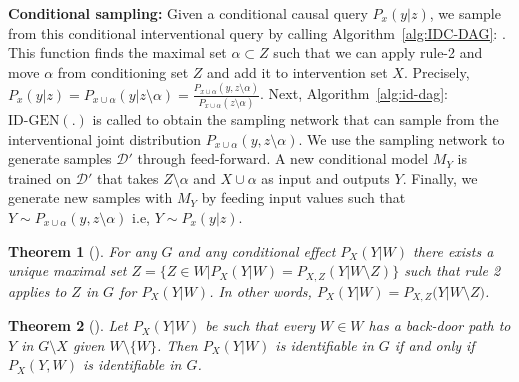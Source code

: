 \documentclass{article}
\newcommand{\data}{\mathcal{D}}
\newcommand{\idgen}{\text{ID-GEN}\xspace}
\newcommand{\idcdag}{\text{IDC-GEN}\xspace}
\theoremstyle{plain}
\newtheorem{theorem}{Theorem}[section]
\theoremstyle{definition}
\theoremstyle{remark}
\begin{document}
	\label{appex:cond-intv-samp}
	\textbf{Conditional sampling:}
	Given a conditional causal query $P_{x}({y}|{z})$,
	we sample from this conditional interventional query by calling Algorithm~\ref{alg:IDC-DAG}: \idcdag. 
	This function finds the maximal set ${\alpha }\subset {Z}$ such that we can apply rule-2 and move ${\alpha}$ from conditioning set ${Z}$ and add it to intervention set ${X}$. Precisely, $P_{{x}}({y}|{z})= P_{{x\cup \alpha}}({y}|{z\setminus \alpha}) =  \frac{P_{{x\cup \alpha}}({y},{z\setminus \alpha})}{P_{{x\cup \alpha}}({z\setminus \alpha})} $. 
	Next, Algorithm~\ref{alg:id-dag}: $\mathrm{\idgen(.)}$ is called to obtain the sampling network that can sample from the interventional joint distribution $P_{{x\cup \alpha}}({y},{z\setminus \alpha})$. 
	We use the sampling network to generate samples $\data'$ through feed-forward.
	A new conditional model $M_{{Y}}$ is trained on $\data'$ that takes ${Z\setminus \alpha}$ and $X\cup \alpha$ as input and outputs ${Y}$. Finally, we generate new samples with $M_{{Y}}$ by feeding input values such that $Y\sim P_{{x\cup \alpha}}({y},{z\setminus \alpha})$ i.e,  $Y\sim P_{x}(y|z)$.
	
	
	
	
	
	
	\begin{theorem}[\citet{shpitser2008complete}]
		\label{theorem20}
		For any $G$ and any conditional effect $P_{{X}}({Y}|{W})$ there exists a unique maximal set
		${Z}= \{Z \in {W}|P_{{X}}({Y}|{W}) = P_{{X,Z}}({Y|W} \setminus {Z})\}$ such that rule 2 applies to ${Z}$ in $G$ for $P_{{X}}({Y}|{W})$. In other words, $P_{{X}}({Y}|{W}) = P_{{X,Z}}({Y|W \setminus Z)}$.
	\end{theorem}
	
	
	\begin{theorem}[\citet{shpitser2008complete}]
		\label{theorem21}
		Let $P_{{X}}({Y}|{W})$ be such that every $W \in  {W} $ has a back-door path to $Y$ in $G\setminus {X}$ given
		${W}\setminus \{W\}$. Then $P_{{X}}({Y|W})$ is identifiable in $G$ if and only if $P_{{X}}({Y, W})$ is identifiable in $G$.
	\end{theorem}
	
	
	
\end{document}
